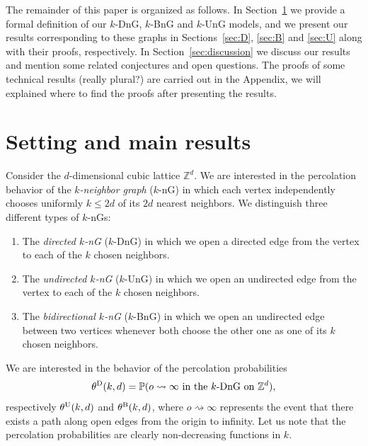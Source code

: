 \documentclass{article}
\theoremstyle{definition}
\newcommand{\1}{\mathbbm{1}}
\newcommand{\0}{\mathbf{o}}
\begin{document}
The remainder of this paper is organized as follows. In Section~\ref{sec:set} we provide a formal definition of our $k$-DnG, $k$-BnG and $k$-UnG models, and we present our results corresponding to these graphs in Sections~\ref{sec:D}, \ref{sec:B} and \ref{sec:U} along with their proofs, respectively. In Section~\ref{sec:discussion} we discuss our results and mention some related conjectures and open questions. The proofs of some technical results \color{red}(really plural?) \color{black} are carried out in the Appendix, we will explained where to find the proofs after presenting the results.

\section{Setting and main results}\label{sec:set}

Consider the $d$-dimensional cubic lattice $\mathbb Z^d$. We are interested in the percolation behavior of the {\em $k$-neighbor graph} ($k$-nG) in which each vertex independently chooses uniformly $k\le 2d$ of its $2d$ nearest neighbors. We distinguish three different types of $k$-nGs:
\begin{enumerate}
\item The {\em directed $k$-nG} ($k$-DnG) in which we open a directed edge from the vertex to each of the $k$ chosen neighbors. 
\item The {\em undirected $k$-nG} ($k$-UnG) in which we open an undirected edge from the vertex to each of the $k$ chosen neighbors.
\item The {\em bidirectional $k$-nG} ($k$-BnG) in which we open an undirected edge between two vertices whenever both choose the other one as one of its $k$ chosen neighbors.
\end{enumerate}

We are interested in the behavior of the percolation probabilities 
$$
\theta^{\rm D}(k,d)=\mathbb P(o\rightsquigarrow\infty \text{ in the $k$-DnG on $\mathbb Z^d$}),
$$
respectively $\theta^{\rm U}(k,d)$ and $\theta^{\rm B}(k,d)$, %
where $o\rightsquigarrow\infty$ represents the event that there exists a path along open edges from the origin to infinity. Let us note that the percolation probabilities are clearly non-decreasing functions in $k$. 
\end{document}
